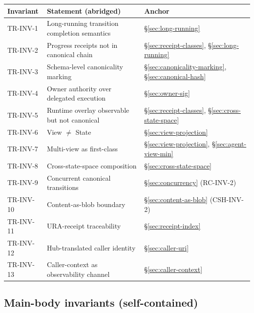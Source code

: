 \documentclass[11pt,a4paper]{article}
\theoremstyle{definition}
\begin{document}
\begin{center}
\renewcommand{\arraystretch}{1.25}
\begin{tabularx}{\linewidth}{l X l}
\toprule
\textbf{Invariant} & \textbf{Statement (abridged)} & \textbf{Anchor} \\
\midrule
TR-INV-1  & Long-running transition completion semantics       & \S\ref{sec:long-running} \\
TR-INV-2  & Progress receipts not in canonical chain           & \S\ref{sec:receipt-classes}, \S\ref{sec:long-running} \\
TR-INV-3  & Schema-level canonicality marking                  & \S\ref{sec:canonicality-marking}, \S\ref{sec:canonical-hash} \\
TR-INV-4  & Owner authority over delegated execution           & \S\ref{sec:owner-sig} \\
TR-INV-5  & Runtime overlay observable but not canonical       & \S\ref{sec:receipt-classes}, \S\ref{sec:cross-state-space} \\
TR-INV-6  & View $\neq$ State                                  & \S\ref{sec:view-projection} \\
TR-INV-7  & Multi-view as first-class                          & \S\ref{sec:view-projection}, \S\ref{sec:agent-view-min} \\
TR-INV-8  & Cross-state-space composition                      & \S\ref{sec:cross-state-space} \\
TR-INV-9  & Concurrent canonical transitions                   & \S\ref{sec:concurrency} (RC-INV-2) \\
TR-INV-10 & Content-as-blob boundary                           & \S\ref{sec:content-as-blob} (CSH-INV-2) \\
TR-INV-11 & URA-receipt traceability                           & \S\ref{sec:receipt-index} \\
TR-INV-12 & Hub-translated caller identity                     & \S\ref{sec:caller-uri} \\
TR-INV-13 & Caller-context as observability channel            & \S\ref{sec:caller-context} \\
\bottomrule
\end{tabularx}
\end{center}

\subsection{Main-body invariants (self-contained)}
\end{document}
